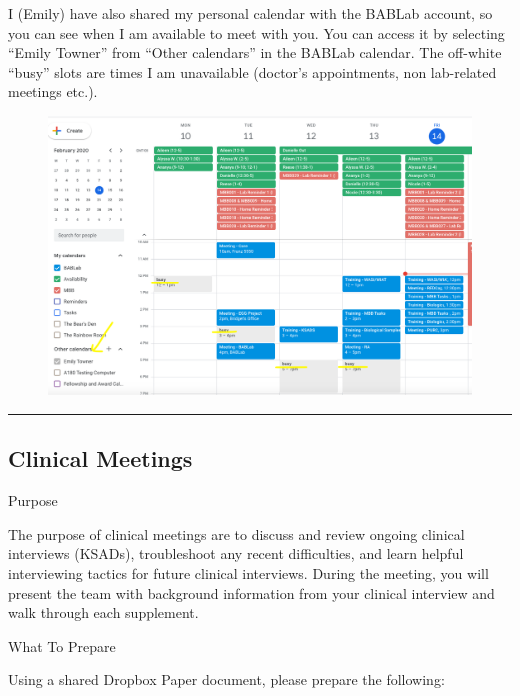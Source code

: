 \documentclass[]{book}
\begin{document}
I (Emily) have also shared my personal calendar with the BABLab account, so you can see when I am available to meet with you. You can access it by selecting ``Emily Towner'' from ``Other calendars'' in the BABLab calendar. The off-white ``busy'' slots are times I am unavailable (doctor's appointments, non lab-related meetings etc.).

\begin{figure}
\centering
\includegraphics{images/lab_protocols/trainee_tuesdays_thursdays/2.png}
\caption{}
\end{figure}

\begin{center}\rule{0.5\linewidth}{\linethickness}\end{center}

\hypertarget{clinical-meetings}{%
\subsection{Clinical Meetings}\label{clinical-meetings}}

Purpose

The purpose of clinical meetings are to discuss and review ongoing clinical interviews (KSADs), troubleshoot any recent difficulties, and learn helpful interviewing tactics for future clinical interviews. During the meeting, you will present the team with background information from your clinical interview and walk through each supplement.

What To Prepare

Using a shared Dropbox Paper document, please prepare the following:
\end{document}

